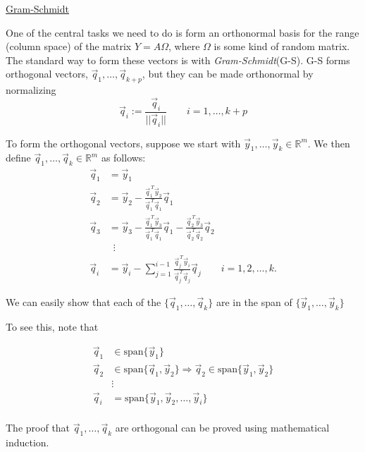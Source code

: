 
\underline{Gram-Schmidt}

One of the central tasks we need to do is form an orthonormal basis for the range (column space) of
the matrix $Y=A\Omega$, where $\Omega$ is some kind of random matrix. The standard way to form these
vectors is with \emph{Gram-Schmidt}(G-S).  G-S forms orthogonal vectors, $\vec{q}_1, \ldots, \vec{q}_{k+p}$, but they can be made orthonormal by normalizing
\begin{equation*}
    \vec{q}_i := \frac{\vec{q}_i}{||\vec{q}_i||} \qquad i=1, \ldots, k+p
\end{equation*}

To form the orthogonal vectors, suppose we start with $\vec{y}_1, \ldots, \vec{y}_k \in\mathbb{R}^m$. We then define $\vec{q}_1, \ldots, \vec{q}_k \in\mathbb{R}^m$ as follows:
\begin{align*}
    \vec{q}_1 &= \vec{y}_1 \\
    \vec{q}_2 &= \vec{y}_2 - \frac{\vec{q}^{\,T}_1\vec{y}_2}{\vec{q}_1^{\,T}\vec{q}_1}\vec{q}_1\\
    \vec{q}_3 &= \vec{y}_3 - \frac{\vec{q}^{\,T}_1\vec{y}_3}{\vec{q}_1^{\,T}\vec{q}_1}\vec{q}_1
    -
    \frac{\vec{q}^{\,T}_2\vec{y}_3}{\vec{q}_2^{\,T}\vec{q}_2}\vec{q}_2
    \\
    &\enspace\vdots \\
    \vec{q}_i &= \vec{y}_i - \sum_{j=1}^{i-1} \frac{\vec{q}^{\,T}_j\vec{y}_i}{\vec{q}_j^{\,T}\vec{q}_j}\vec{q}_j \qquad i=1, 2, \ldots, k.
\end{align*}

We can easily show that each of the $\{\vec{q}_1, \ldots, \vec{q}_{k}\}$ are in the span of $\{\vec{y}_1, \ldots, \vec{y}_{k}\}$

To see this, note that

\begin{align*}
    \vec{q}_1 &\in \text{span} \{ \vec{y}_1 \} \\
    \vec{q}_2 &\in \text{span} \{ \vec{q}_1, \vec{y}_2 \}
    \Rightarrow
    \vec{q}_2 \in \text{span} \{ \vec{y}_1, \vec{y}_2 \}
    \\
    &\vdots\\
    \vec{q}_i &= \text{span} \{ \vec{y}_1, \vec{y}_2, \ldots, \vec{y}_i \} \\
\end{align*}

The proof that $\vec{q}_1, \ldots, \vec{q}_{k}$ are orthogonal can be proved using mathematical induction.

